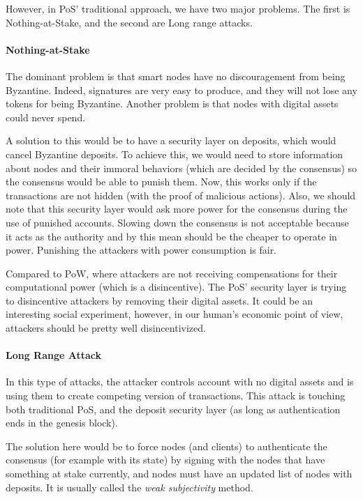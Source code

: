 However, in PoS' traditional approach, we have two major problems. The first is Nothing-at-Stake, and the second are Long range attacks.

\paragraph{Nothing-at-Stake}
The dominant problem is that smart nodes have no discouragement from being Byzantine\cite{Lamport1982TheProblem}. Indeed, signatures are very easy to produce, and they will not lose any tokens for being Byzantine. Another problem is that nodes with digital assets could never spend.

A solution to this would be to have a security layer on deposits, which would cancel Byzantine deposits. To achieve this, we would need to store information about nodes and their immoral behaviors (which are decided by the consensus) so the consensus would be able to punish them. Now, this works only if the transactions are not hidden (with the proof of malicious actions). Also, we should note that this security layer would ask more power for the consensus during the use of punished accounts. Slowing down the consensus is not acceptable because it acts as the authority and by this mean should be the cheaper to operate in power. Punishing the attackers with power consumption is fair.

Compared to PoW, where attackers are not receiving compensations for their computational power (which is a disincentive). The PoS' security layer is trying to disincentive attackers by removing their digital assets. It could be an interesting social experiment, however, in our human's economic point of view, attackers should be pretty well disincentivized.  

\paragraph{Long Range Attack}
In this type of attacks, the attacker controls account with no digital assets and is using them to create competing version of transactions. This attack is touching both traditional PoS, and the deposit security layer (as long as authentication ends in the genesis block).

The solution here would be to force nodes (and clients) to authenticate the consensus (for example with its state) by signing with the nodes that have something at stake currently, and nodes must have an updated list of nodes with deposits. It is usually called the \textit{weak subjectivity} method.

